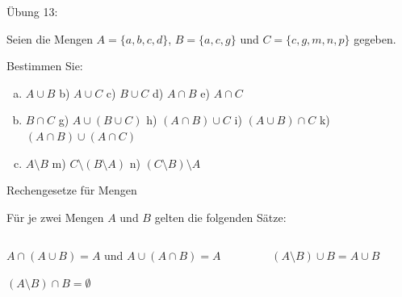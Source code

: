 \documentclass[12pt,ngerman,a4paper,ignorenonframetext,]{beamer}
\begin{document}
\begin{frame}{Übung 13:}
\protect\hypertarget{ubung-13}{}

Seien die Mengen \(A = \{a, b, c, d\}\), \(B=\{a, c, g\}\) und
\mbox{$C=\{c, g, m, n,p\}$} gegeben.

Bestimmen Sie:

\begin{enumerate}
[a)]
\item
  \(A \cup B\) b) \(A \cup C\) c) \(B \cup C\) d) \(A \cap B\) e)
  \(A \cap C\)
\item
  \(B \cap C\) g) \(A \cup (B \cup C)\) h) \((A \cap B) \cup C\) i)
  \((A \cup B) \cap C\) k) \((A \cap B) \cup (A \cap C)\)
\item
  \(A \setminus B\) m) \(C \setminus (B \setminus A)\) n)
  \((C \setminus B) \setminus A\)
\end{enumerate}

\end{frame}

\begin{frame}{Rechengesetze für Mengen}
\protect\hypertarget{rechengesetze-fur-mengen}{}

Für je zwei Mengen \(A\) und \(B\) gelten die folgenden Sätze:

\begin{columns}[T]
\begin{column}{0.49\textwidth}

\begin{Satz}[Absorptionsgesetz]

\(A \cap (A \cup B) = A\) und \(A \cup (A \cap B) = A\)

\end{Satz}


\begin{Satz}

\((A\setminus B) \cap B = \emptyset\)

\end{Satz}
\end{column}

\begin{column}{0.49\textwidth}

\begin{Satz}[v. ausgeschlossenen 3.]

\((A \setminus B) \cup B = A \cup B\)

\end{Satz}


\end{column}
\end{columns}

\end{frame}
\end{document}
